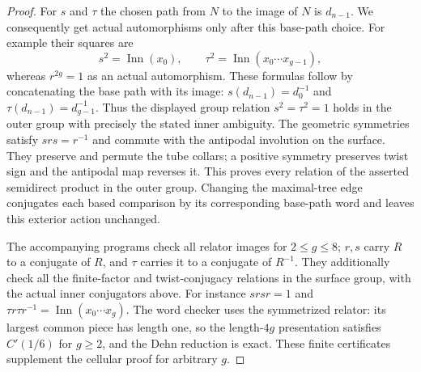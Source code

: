 \begin{proof}
For $s$ and $\tau$ the chosen path from $N$ to the image of $N$ is
$d_{n-1}$. We consequently get actual automorphisms only after this
base-path choice. For example their squares are
\[
 s^2=\operatorname{Inn}(x_0),\qquad
 \tau^2=\operatorname{Inn}(x_0\cdots x_{g-1}),
\]
whereas $r^{2g}=1$ as an actual automorphism. These formulas follow
by concatenating the base path with its image: $s(d_{n-1})=d_0^{-1}$
and $\tau(d_{n-1})=d_{g-1}^{-1}$. Thus the displayed group relation
$s^2=\tau^2=1$ holds in the outer group with precisely the stated
inner ambiguity. The geometric symmetries satisfy $srs=r^{-1}$ and
commute with the antipodal involution on the surface. They preserve
and permute the tube collars; a positive symmetry preserves twist
sign and the antipodal map reverses it. This proves every relation
of the asserted semidirect product in the outer group. Changing the
maximal-tree edge conjugates each based comparison by its corresponding
base-path word and leaves this exterior action unchanged.

The accompanying programs check all relator images for $2\le g\le8$;
$r,s$ carry $R$ to a conjugate of $R$, and $\tau$ carries it to a
conjugate of $R^{-1}$. They additionally check all the finite-factor
and twist-conjugacy relations in the surface group, with the actual
inner conjugators above. For instance $srsr=1$ and
$\tau r\tau r^{-1}=\operatorname{Inn}(x_0\cdots x_g)$.
The word checker uses the symmetrized relator: its largest common
piece has length one, so the length-$4g$ presentation satisfies
$C'(1/6)$ for $g\ge2$, and the Dehn reduction is exact. These finite
certificates supplement the cellular proof for arbitrary $g$.
\end{proof}

